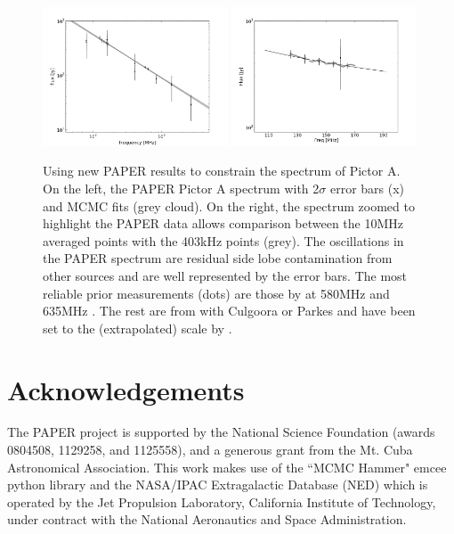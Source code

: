 \documentclass[preprint]{aastex}
\begin{document}
\begin{figure}[htbp]
\includegraphics[width=0.49\textwidth]{plots/pictor_spectrum.png}
\includegraphics[width=0.49\textwidth]{plots/pictor_spectrum_zoom.png}
\caption{
Using new PAPER results to constrain the spectrum of Pictor A.  On the left,
the PAPER Pictor A spectrum with 2$\sigma$ error bars (x) and  MCMC fits (grey
cloud). On the right, the spectrum zoomed to highlight the PAPER data
 allows comparison between the 10MHz averaged points with the
403kHz points (grey). The oscillations in the PAPER spectrum are residual side
lobe contamination from other sources and are well represented by the error
bars.  The most reliable prior measurements (dots) are those by
\cite{Wills:1975p9314} at 580MHz and 635MHz \citep{Perley:1997p9312}. The rest
are from with Culgoora \cite{Slee:1995p7541} or Parkes
\cite{Otrupcek:1991p8780} and have been set to the (extrapolated)
\citet{Baars:1977p9678} scale by  \cite{Kuehr:1981p9628}. 
} \label{fig:pic_spectrum}
\end{figure}




\section*{Acknowledgements}

The PAPER project is supported by the National Science Foundation (awards
0804508, 1129258, and 1125558), and a generous grant from the Mt. Cuba
Astronomical Association.
This work makes use of the ``MCMC Hammer" emcee python library \citep[
\url{http://danfm.ca/emcee/}]{ForemanMackey:2012p8684}  and the NASA/IPAC
Extragalactic Database (NED) which is operated by the Jet Propulsion
Laboratory, California Institute of Technology, under contract with the
National Aeronautics and Space Administration.
\end{document}
